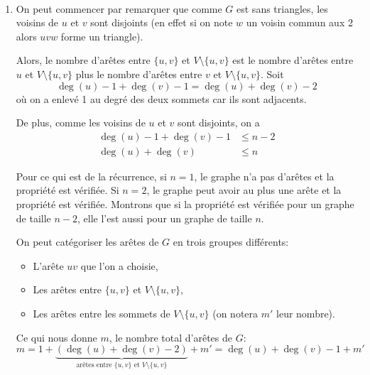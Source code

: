 \begin{td-sol}[]\, %
    \begin{enumerate}
        \item On peut commencer par remarquer que comme \(G\) est sans triangles,
        les voisins de \(u\) et \(v\) sont disjoints (en effet si 
        on note \(w\) un voisin commun aux 2 alors \(uvw\) forme un triangle).
        
        Alors, le nombre d'arêtes entre \(\{u,v\}\) et \(V\setminus\{u,v\}\)
        est le nombre d'arêtes entre \(u\) et \(V\setminus\{u,v\}\)
        plus le nombre d'arêtes entre \(v\) et \(V\setminus\{u,v\}\). Soit
        \begin{equation*}
            \deg(u) - 1 + \deg(v) - 1 = \deg(u) + \deg(v) - 2
        \end{equation*}
        où on a enlevé 1 au degré des deux sommets car ils sont adjacents.

        De plus, comme les voisins de \(u\) et \(v\) sont disjoints,
        on a
        \begin{equation*}
            \begin{aligned}
                \deg(u) - 1 + \deg(v) - 1 &\leq n - 2 \\
                \deg(u) + \deg(v) &\leq n
            \end{aligned}
        \end{equation*}

        Pour ce qui est de la récurrence, si \(n=1\), le graphe
        n'a pas d'arêtes et la propriété est vérifiée.
        Si \(n=2\), le graphe peut avoir au plus une arête
        et la propriété est vérifiée. Montrons que si 
        la propriété est vérifiée pour un graphe de taille \(n-2\),
        elle l'est aussi pour un graphe de taille \(n\).

        On peut catégoriser les arêtes de \(G\) en trois groupes différents:
        \begin{itemize}
            \item L'arête \(uv\) que l'on a choisie,
            \item Les arêtes entre \(\{u,v\}\) et \(V\setminus\{u,v\}\),
            \item Les arêtes entre les sommets de \(V\setminus\{u,v\}\) (on 
            notera \(m'\) leur nombre).
        \end{itemize}
        Ce qui nous donne \(m\), le nombre total d'arêtes de \(G\):
        \begin{equation*}
            m = 1 + \underbrace{(\deg(u) + \deg(v) - 2)}_{\text{arêtes entre } \{u,v\} \text{ et } V\setminus\{u,v\}} + m' = \deg(u) + \deg(v) - 1 + m'
        \end{equation*}


\end{enumerate}
\end{td-sol}
